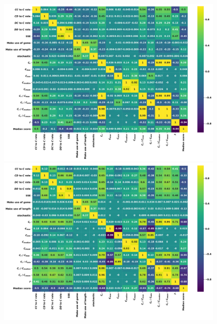 \documentclass{article}
\begin{document}
\begin{figure}
    \begin{minipage}{.5\textwidth}
        \centering
        \includegraphics[width=\textwidth]{../images/standard_correlation_plot.pdf}
    \end{minipage}
    \begin{minipage}{.5\textwidth}
        \centering
        \includegraphics[width=\textwidth]{../images/noise_correlation_plot.pdf}
    \end{minipage}
    \begin{minipage}{.5\textwidth}
        \centering

\end{minipage}
\end{figure}
\end{document}
